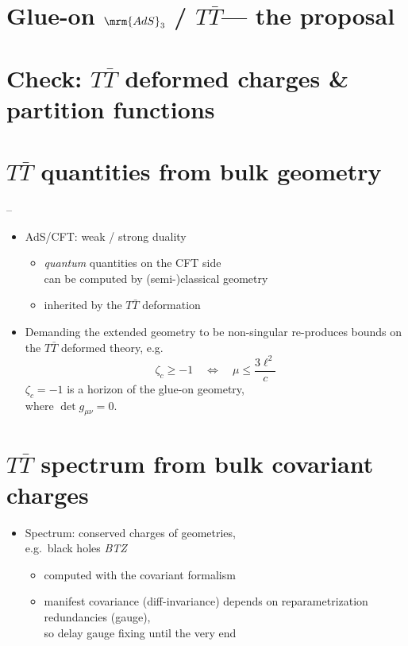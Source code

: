 \documentclass[11pt]{article}
\renewenvironment{frame}[1]%
	{\section*{#1}}%
	{}
\newcommand{\TTbar}{\texorpdfstring{\ensuremath{T\bar{T}}}{TTbar}\xspace}
\begin{document}
\begin{multicols}{3}
\begin{frame}{Glue-on $\mrm{AdS}_3$ / \TTbar --- the proposal}{}
\end{frame}

\section{\textbf{Check:} \TTbar deformed charges \& partition functions} \label{se:charges}

\begin{frame}{\TTbar quantities from bulk geometry}{%
	\textcite{Apolo:2023vnm} -- 
}

\begin{itemize}
\item AdS/CFT: weak / strong duality
	\begin{itemize}
	\item \textit{quantum} quantities on the CFT side\\
		can be computed by (semi-)classical geometry
	\item inherited by the \TTbar deformation
	\end{itemize}
	

\item Demanding the extended geometry to be non-singular
	re-produces bounds on the \TTbar deformed theory, e.g.
	\begin{equation}
		\zeta_c \ge -1 \quad \Leftrightarrow \quad\mu\le \frac{ 3\ell^2 }{c} \label{reality}
	\end{equation}
	$\zeta_c = -1$ is a horizon of the glue-on geometry, \\
	where $\det g_{\mu\nu} = 0$.
	
\end{itemize}


\end{frame}


\begin{frame}{\TTbar spectrum from bulk covariant charges}{%
	\textcite{Kraus:2021cwf,Apolo:2023vnm}
}

\begin{itemize}
\item Spectrum: conserved charges of geometries,\\
	e.g.~black holes \textit{BTZ} \cite{Banados:1992wn}
	\begin{itemize}
	\item computed with the covariant formalism\\
		\textcite{Iyer:1994ys, Barnich:2001jy}
	\item manifest covariance (diff-invariance) depends on reparametrization redundancies (gauge),\\
		so delay gauge fixing until the very end
	\end{itemize}
	


\end{itemize}
\end{frame}
\end{multicols}
\end{document}
